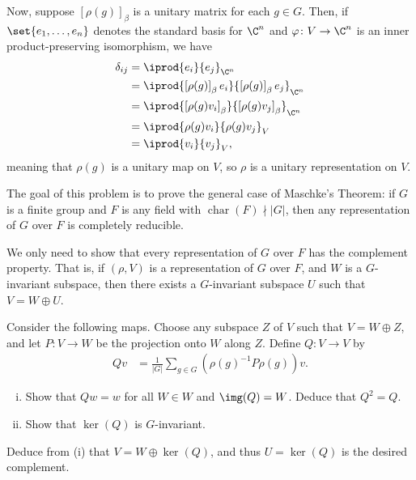 \documentclass[10pt]{mypackage}
\begin{document}
\begin{solution}
\begin{enumerate}[(a)]
      Now, suppose $\left[ \rho(g) \right]_{\beta}$ is a unitary matrix for each $g\in G$. Then, if $\set{e_1,\dots,e_n}$ denotes the standard basis for $\C^n$ and $\varphi\colon V\rightarrow \C^n$ is an inner product-preserving isomorphism, we have
      \begin{align*}
        \delta_{ij} &= \iprod{e_i}{e_j}_{\C^n}\\
                    &= \iprod{\left[ \rho(g) \right]_{\beta}e_i}{\left[ \rho(g) \right]_{\beta}e_j}_{\C^n}\\
                    &= \iprod{\left[ \rho(g)v_i \right]_{\beta}}{\left[ \rho(g)v_j \right]_{\beta}}_{\C^n}\\
                    &= \iprod{\rho(g)v_i}{\rho(g)v_j}_{V}\\
                    &= \iprod{v_i}{v_j}_{V},
      \end{align*}
      meaning that $\rho(g)$ is a unitary map on $V$, so $\rho$ is a unitary representation on $V$.
  \end{enumerate}
\end{solution}
\begin{problem}[Problem 3]
  The goal of this problem is to prove the general case of Maschke's Theorem: if $G$ is a finite group and $F$ is any field with $\operatorname{char}\left( F \right)\nmid \left\vert G \right\vert$, then any representation of $G$ over $F$ is completely reducible.

  We only need to show that every representation of $G$ over $F$ has the complement property. That is, if $\left( \rho,V \right)$ is a representation of $G$ over $F$, and $W$ is a $G$-invariant subspace, then there exists a $G$-invariant subspace $U$ such that $V = W\oplus U$.

  Consider the following maps. Choose any subspace $Z$ of $V$ such that $V = W\oplus Z$, and let $P\colon V\rightarrow W$ be the projection onto $W$ along $Z$. Define $Q\colon V\rightarrow V$ by
  \begin{align*}
    Qv &= \frac{1}{\left\vert G \right\vert} \sum_{g\in G} \left( \rho\left( g \right)^{-1}P\rho(g) \right) v.
  \end{align*}
  \begin{enumerate}[(i)]
    \item Show that $Qw = w$ for all $W\in W$ and $\img(Q) = W$. Deduce that $Q^2 = Q$.
    \item Show that $\ker\left( Q \right)$ is $G$-invariant.
  \end{enumerate}
  Deduce from (i) that $V = W\oplus \ker\left( Q \right)$, and thus $U = \ker\left( Q \right)$ is the desired complement.
\end{problem}
\end{document}

